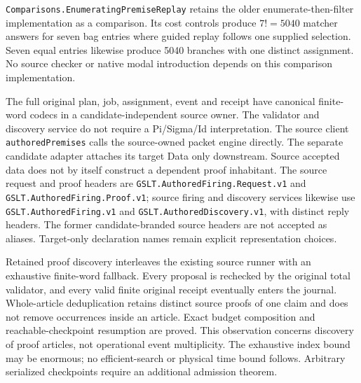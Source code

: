 \documentclass[11pt]{article}
\newcommand{\code}[1]{\nolinkurl{#1}}
\begin{document}
\code{Comparisons.EnumeratingPremiseReplay} retains the older
enumerate-then-filter implementation as a comparison. Its cost controls produce
$7!=5040$ matcher answers for seven bag entries where guided replay follows
one supplied selection. Seven equal entries likewise produce 5040 branches
with one distinct assignment. No source checker or native modal introduction
depends on this comparison implementation.

The full original plan, job, assignment, event and receipt have canonical
finite-word codecs in a candidate-independent source owner. The validator
and discovery service do not require a Pi/Sigma/Id interpretation. The
source client \code{authoredPremises} calls the source-owned packet engine
directly. The separate candidate adapter attaches its target Data only
downstream. Source accepted data does not
by itself construct a dependent proof inhabitant.
The source request and proof headers are
\code{GSLT.AuthoredFiring.Request.v1} and
\code{GSLT.AuthoredFiring.Proof.v1}; source firing and discovery services
likewise use \code{GSLT.AuthoredFiring.v1} and
\code{GSLT.AuthoredDiscovery.v1}, with distinct reply headers. The former
candidate-branded source headers are not accepted as aliases. Target-only
declaration names remain explicit representation choices.

Retained proof discovery interleaves the existing source runner with an
exhaustive finite-word fallback. Every proposal is rechecked by the original
total validator, and every valid finite original receipt eventually enters
the journal. Whole-article deduplication retains distinct source proofs of
one claim and does not remove occurrences inside an article. Exact budget
composition and reachable-checkpoint resumption are proved. This observation
concerns discovery of proof articles, not operational event multiplicity.
The exhaustive index bound may be enormous; no efficient-search or physical
time bound follows. Arbitrary serialized checkpoints require an additional
admission theorem.
\end{document}
